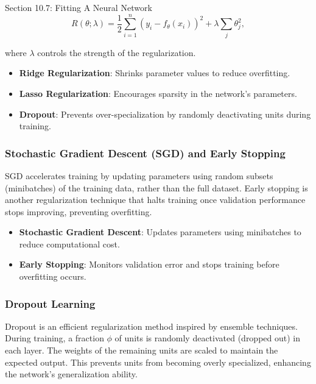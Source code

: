 \begin{notes}{Section 10.7: Fitting A Neural Network}
    \[
    R(\theta; \lambda) = \frac{1}{2} \sum_{i=1}^{n} \left( y_i - f_\theta(x_i) \right)^2 + \lambda \sum_{j} \theta_j^2,
    \]
    
    where $\lambda$ controls the strength of the regularization.
    
    \begin{highlight}
        \begin{itemize}
            \item \textbf{Ridge Regularization}: Shrinks parameter values to reduce overfitting.
            \item \textbf{Lasso Regularization}: Encourages sparsity in the network's parameters.
            \item \textbf{Dropout}: Prevents over-specialization by randomly deactivating units during training.
        \end{itemize}
    \end{highlight}
    
    \subsubsection*{Stochastic Gradient Descent (SGD) and Early Stopping}
    
    SGD accelerates training by updating parameters using random subsets (minibatches) of the training data, rather than the full dataset. Early stopping is another regularization technique that halts training 
    once validation performance stops improving, preventing overfitting.
    
    \begin{highlight}
        \begin{itemize}
            \item \textbf{Stochastic Gradient Descent}: Updates parameters using minibatches to reduce computational cost.
            \item \textbf{Early Stopping}: Monitors validation error and stops training before overfitting occurs.
        \end{itemize}
    \end{highlight}
    
    \subsubsection*{Dropout Learning}
    
    Dropout is an efficient regularization method inspired by ensemble techniques. During training, a fraction $\phi$ of units is randomly deactivated (dropped out) in each layer. The weights of the remaining 
    units are scaled to maintain the expected output. This prevents units from becoming overly specialized, enhancing the network's generalization ability.
    

\end{notes}
